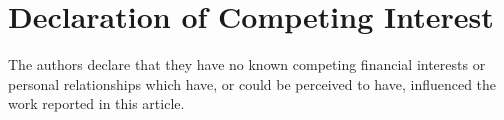 \documentclass[times,final]{elsarticle}
\begin{document}
\section*{Declaration of Competing Interest}

The authors declare that they have no known competing financial interests or personal relationships which have, or could be perceived to have, influenced the work reported in this article.

%
%
%
%
%
%
%
%
\end{document}
